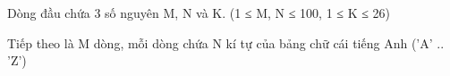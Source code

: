Dòng đầu chứa 3 số nguyên M, N và K. (1 ≤ M, N ≤ 100, 1 ≤ K ≤ 26)  

   Tiếp theo là M dòng, mỗi dòng chứa N kí tự của bảng chữ cái tiếng Anh ('A' .. 'Z')
